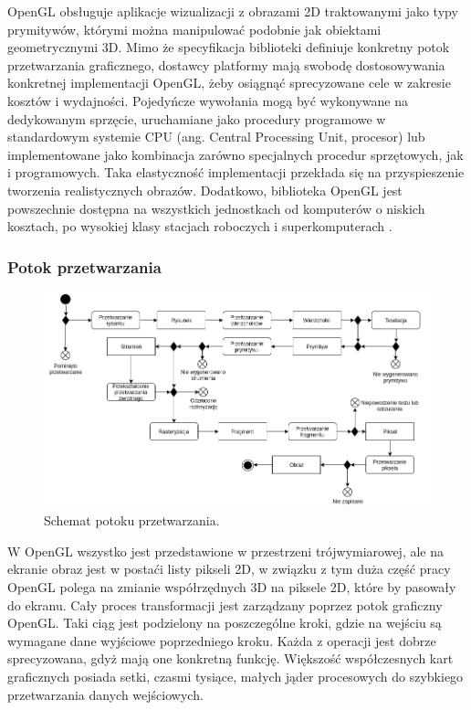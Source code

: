 OpenGL obsługuje aplikacje wizualizacji z obrazami 2D traktowanymi jako typy prymitywów, którymi można manipulować podobnie jak obiektami geometrycznymi 3D. Mimo że specyfikacja biblioteki definiuje konkretny potok przetwarzania graficznego, dostawcy platformy mają swobodę dostosowywania konkretnej implementacji OpenGL, żeby osiągnąć sprecyzowane cele w zakresie kosztów i wydajności. Pojedyńcze wywołania mogą być wykonywane na dedykowanym sprzęcie, uruchamiane jako procedury programowe w standardowym systemie CPU (ang. Central Processing Unit, procesor) lub implementowane jako kombinacja zarówno specjalnych procedur sprzętowych, jak i programowych. Taka elastyczność implementacji przekłada się na przyspieszenie tworzenia realistycznych obrazów. Dodatkowo, biblioteka OpenGL jest powszechnie dostępna na wszystkich jednostkach od komputerów o niskich kosztach, po wysokiej klasy stacjach roboczych i superkomputerach \cite{openglofficial}.
\subsubsection{Potok przetwarzania}
\begin{figure}[H]
		\centering
 		\includegraphics[width=15.5cm]{OpenGL.png}
    	\caption{Schemat potoku przetwarzania.}
 		\label{rys7}
\end{figure}
W OpenGL wszystko jest przedstawione w przestrzeni trójwymiarowej, ale na ekranie obraz jest w postaći listy pikseli 2D, w związku z tym duża część pracy OpenGL polega na zmianie współrzędnych 3D na piksele 2D, które by pasowały do ekranu. Cały proces transformacji jest zarządzany poprzez potok graficzny OpenGL. Taki ciąg jest podzielony na poszczególne kroki, gdzie na wejściu są wymagane dane wyjściowe poprzedniego kroku. Każda z operacji jest dobrze sprecyzowana, gdyż mają one konkretną funkcję. Większość współczesnych kart graficznych posiada setki, czasmi tysiące, małych jąder procesowych do szybkiego przetwarzania danych wejściowych.

